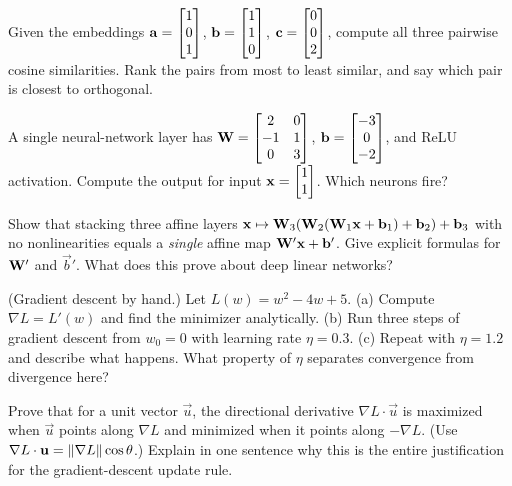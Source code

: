 \begin{exercise}
Given the embeddings $\mathbf{a}=\begin{bmatrix}1\\0\\1\end{bmatrix}$, $\mathbf{b}=\begin{bmatrix}1\\1\\0\end{bmatrix}$,
$\mathbf{c}=\begin{bmatrix}0\\0\\2\end{bmatrix}$, compute all three pairwise cosine similarities. Rank the pairs
from most to least similar, and say which pair is closest to orthogonal.
\end{exercise}

\begin{exercise}
A single neural-network layer has
$\mathbf{W}=\begin{bmatrix}2&0\\-1&1\\0&3\end{bmatrix}$, $\mathbf{b}=\begin{bmatrix}-3\\0\\-2\end{bmatrix}$, and
ReLU activation. Compute the output for input $\mathbf{x}=\begin{bmatrix}1\\1\end{bmatrix}$. Which neurons fire?
\end{exercise}

\begin{exercise}
Show that stacking three affine layers $\mathbf{x}\mapsto\mathbf{W}_3(\mathbf{W}_2(\mathbf{W}_1\mathbf{x}
+\mathbf{b}_1)+\mathbf{b}_2)+\mathbf{b}_3$ with no nonlinearities equals a \emph{single} affine map
$\mathbf{W}'\mathbf{x}+\mathbf{b}'$. Give explicit formulas for $\mathbf{W}'$ and $\vec{b}'$. What does
this prove about deep linear networks?
\end{exercise}

\begin{exercise}
(Gradient descent by hand.) Let $L(w)=w^2-4w+5$.
(a) Compute $\nabla L = L'(w)$ and find the minimizer analytically.
(b) Run three steps of gradient descent from $w_0=0$ with learning rate $\eta=0.3$.
(c) Repeat with $\eta=1.2$ and describe what happens. What property of $\eta$ separates
convergence from divergence here?
\end{exercise}

\begin{exercise}
Prove that for a unit vector $\vec{u}$, the directional derivative $\nabla L\cdot\vec{u}$
is maximized when $\vec{u}$ points along $\nabla L$ and minimized when it points along
$-\nabla L$. (Use $\nabla L\cdot\mathbf{u}=\lVert\nabla L\rVert\cos\theta$.) Explain in one
sentence why this is the entire justification for the gradient-descent update rule.
\end{exercise}

